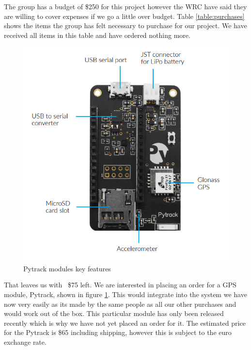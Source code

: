 \documentclass[a4paper,12pt]{article}
\begin{document}
The group has a budget of \$250 for this project however the WRC have said they are willing to cover expenses if we go a little over budget. Table \ref{table:purchases} shows the items the group has felt necessary to purchase for our project. We have received all items in this table and have ordered nothing more. \\

\begin{figure}[h!]
\begin{center}
\includegraphics[scale=0.3]{pytrack.png}
\caption{Pytrack modules key features}
\label{figure:pytrack}
\end{center}
\end{figure}

That leaves us with ~\$75 left. We are interested in placing an order for a GPS module, Pytrack, shown in figure \ref{figure:pytrack}. This would integrate into the system we have now very easily as its made by the same people as all our other purchases and would work out of the box. This particular module has only been released recently which is why we have not yet placed an order for it. The estimated price for the Pytrack is \$65 including shipping, however this is subject to the euro exchange rate.\\
\end{document}
